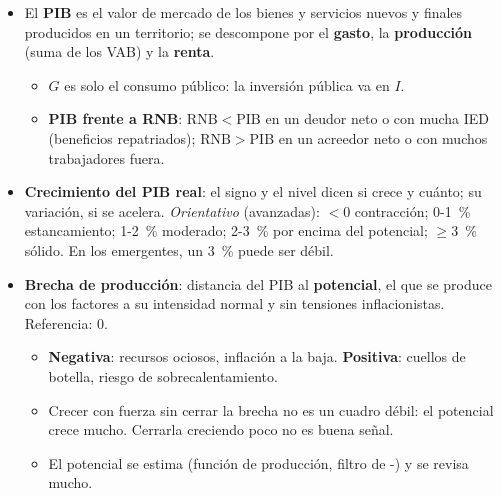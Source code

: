 \documentclass{article}
\begin{document}
\begin{columnas}
\begin{itemize}[itemsep=1.5pt]
\item El \textbf{PIB} es el valor de mercado de los bienes y servicios nuevos y finales producidos en un territorio; se descompone por el \textbf{gasto}, la \textbf{producción} (suma de los VAB) y la \textbf{renta}.
  \begin{itemize}
  \item $G$ es solo el consumo público: la inversión pública va en $I$.
  \item \textbf{PIB frente a RNB}: $\mathrm{RNB}<\mathrm{PIB}$ en un deudor neto o con mucha IED (beneficios repatriados); $\mathrm{RNB}>\mathrm{PIB}$ en un acreedor neto o con muchos trabajadores fuera.
  \end{itemize}
\item \textbf{Crecimiento del PIB real}: el signo y el nivel dicen si crece y cuánto; su variación, si se acelera. \emph{Orientativo} (avanzadas): $<0$ contracción; 0-1~\% estancamiento; 1-2~\% moderado; 2-3~\% por encima del potencial; $\geq3$~\% sólido. En los emergentes, un 3~\% puede ser débil.
\item \textbf{Brecha de producción}: distancia del PIB al \textbf{potencial}, el que se produce con los factores a su intensidad normal y sin tensiones inflacionistas. Referencia: 0.
  \begin{itemize}
  \item \textbf{Negativa}: recursos ociosos, inflación a la baja. \textbf{Positiva}: cuellos de botella, riesgo de sobrecalentamiento.
  \item Crecer con fuerza sin cerrar la brecha no es un cuadro débil: el potencial crece mucho. Cerrarla creciendo poco no es buena señal.
  \item El potencial se estima (función de producción, filtro de -) y se revisa mucho.
  \end{itemize}
\end{itemize}
\begin{itemize}[itemsep=1.5pt]

\end{itemize}
\end{columnas}
\end{document}
